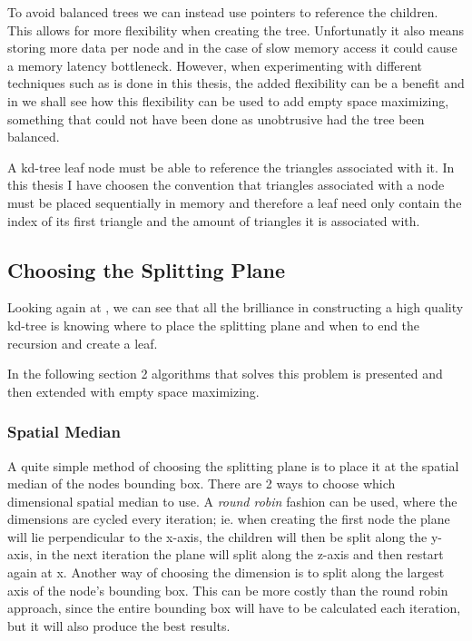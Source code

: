 To avoid balanced trees we can instead use pointers to reference the
children. This allows for more flexibility when creating the tree.
Unfortunatly it also means storing more data per node and in the case
of slow memory access it could cause a memory latency
bottleneck. However, when experimenting with different techniques such
as is done in this thesis, the added flexibility can be a benefit and
in  we shall see how this flexibility
can be used to add empty space maximizing, something that could not
have been done as unobtrusive had the tree been balanced.


A kd-tree leaf node must be able to reference the triangles associated
with it. In this thesis I have choosen the convention that triangles
associated with a node must be placed sequentially in memory and
therefore a leaf need only contain the index of its first triangle and
the amount of triangles it is associated with.

\subsection{Choosing the Splitting Plane}\label{sec:splittingPlane}


Looking again at , we can see that all the
brilliance in constructing a high quality kd-tree is knowing where to
place the splitting plane and when to end the recursion and create a
leaf.


In the following section 2 algorithms that solves this problem is
presented and then extended with empty space maximizing.


\subsubsection{Spatial Median}



A quite simple method of choosing the splitting plane is to place it
at the spatial median of the nodes bounding box. There are 2 ways to
choose which dimensional spatial median to use. A \textit{round robin}
fashion can be used, where the dimensions are cycled every iteration;
ie. when creating the first node the plane will lie perpendicular to
the x-axis, the children will then be split along the y-axis, in the
next iteration the plane will split along the z-axis and then restart
again at x. Another way of choosing the dimension is to split along
the largest axis of the node's bounding box. This can be more costly
than the round robin approach, since the entire bounding box will have
to be calculated each iteration, but it will also produce the best
results.

